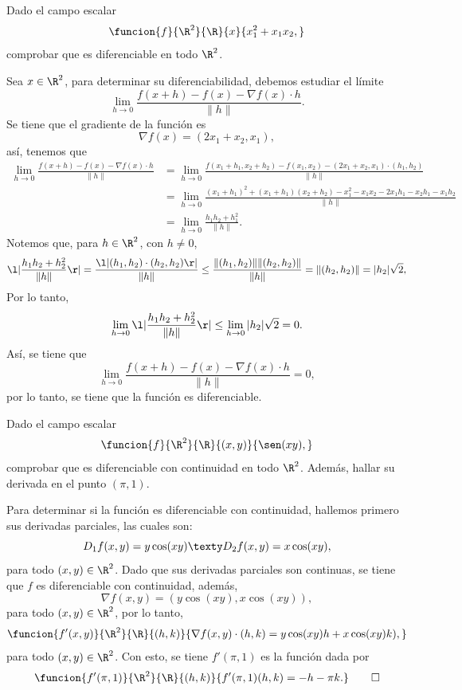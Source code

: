 \documentclass[a4,11pt]{aleph-examen}
\begin{document}
\begin{preguntas}
\begin{respuesta}
\begin{respuesta}
\item 
    Dado el campo escalar
    \[
        \funcion{f}{\R^2}{\R}{x}{x_1^2+x_1x_2,}
    \]
    comprobar que es diferenciable en todo $\R^2$.
    
\begin{respuesta}
    Sea $x\in\R^2$, para determinar su diferenciabilidad, debemos estudiar el límite
    \[
        \lim_{h\to 0}\frac{f(x+h)-f(x)-\nabla f(x)\cdot h}{\|h\|}.
    \]
    Se tiene que el gradiente de la función es
    \[
        \nabla f(x) = (2x_1+x_2,x_1),
    \]
    así, tenemos que
    \begin{align*}
        \lim_{h\to 0}\frac{f(x+h)-f(x)-\nabla f(x)\cdot h}{\|h\|}
            & =  \lim_{h\to 0}\frac{f(x_1+h_1,x_2+h_2)-f(x_1,x_2) - (2x_1+x_2,x_1)\cdot(h_1,h_2)}{\|h\|}\\
            & =  \lim_{h\to 0}\frac{(x_1+h_1)^2+(x_1+h_1)(x_2+h_2)-x_1^2-x_1x_2 - 2x_1h_1-x_2h_1-x_1h_2}{\|h\|}\\
            & =  \lim_{h\to 0}\frac{h_1h_2+h_1^2}{\|h\|}.
    \end{align*}
    Notemos que, para $h\in\R^2$, con $h\neq 0$,
    \[
        \l|\frac{h_1h_2+h_2^2}{\|h\|}\r| 
        = \frac{\l|(h_1,h_2)\cdot(h_2,h_2)\r|}{\|h\|}
        \leq \frac{\|(h_1,h_2)\|\|(h_2,h_2)\|}{\|h\|}
        =\|(h_2,h_2)\|=|h_2|\sqrt{2},
    \]
    Por lo tanto,
    \[
        \lim_{h\to 0}\l|\frac{h_1h_2+h_2^2}{\|h\|}\r|\leq \lim_{h\to 0}|h_2|\sqrt{2}  =0.
    \]
    Así, se tiene que
    \[
        \lim_{h\to 0}\frac{f(x+h)-f(x)-\nabla f(x)\cdot h}{\|h\|}=0,
    \]
    por lo tanto, se tiene que la función es diferenciable.
\end{respuesta}

\item
    Dado el campo escalar
    \[
        \funcion{f}{\R^2}{\R}{(x,y)}{\sen(xy),}
    \]
    comprobar que es diferenciable con continuidad en todo $\R^2$. Además, hallar su derivada en el punto $(\pi,1)$.
    
\begin{respuesta}
    Para determinar si la función es diferenciable con continuidad, hallemos primero sus derivadas parciales, las cuales son:
    \[
        D_1f(x,y)=y\cos(xy)
        \texty
        D_2f(x,y)=x\cos(xy),
    \]
    para todo $(x,y)\in\R^2$. Dado que sus derivadas parciales son continuas, se tiene que $f$ es diferenciable con continuidad, además, 
    \[
        \nabla f(x,y)=(y\cos(xy),x\cos(xy)),
    \]
    para todo $(x,y)\in\R^2$, por lo tanto,
    \[
        \funcion{f'(x,y)}{\R^2}{\R}{(h,k)}{\nabla f(x,y)\cdot(h,k)=y\cos(xy)h+x\cos(xy)k),}
    \]
    para todo $(x,y)\in\R^2$. Con esto, se tiene $f'(\pi,1)$ es la función dada por
    \[
        \funcion{f'(\pi,1)}{\R^2}{\R}{(h,k)}{f'(\pi,1)(h,k)=-h-\pi k.}\qedhere
    \]
\end{respuesta}


\end{respuesta}
\end{respuesta}
\end{preguntas}
\end{document}
